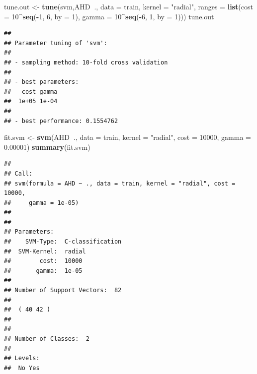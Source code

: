 \documentclass[]{article}
\newenvironment{Shaded}{\begin{snugshade}}{\end{snugshade}}
\newcommand{\DataTypeTok}[1]{\textcolor[rgb]{0.13,0.29,0.53}{#1}}
\newcommand{\DecValTok}[1]{\textcolor[rgb]{0.00,0.00,0.81}{#1}}
\newcommand{\FloatTok}[1]{\textcolor[rgb]{0.00,0.00,0.81}{#1}}
\newcommand{\KeywordTok}[1]{\textcolor[rgb]{0.13,0.29,0.53}{\textbf{#1}}}
\newcommand{\NormalTok}[1]{#1}
\newcommand{\OperatorTok}[1]{\textcolor[rgb]{0.81,0.36,0.00}{\textbf{#1}}}
\newcommand{\StringTok}[1]{\textcolor[rgb]{0.31,0.60,0.02}{#1}}
\begin{document}
\begin{Shaded}
\begin{Highlighting}[]
\NormalTok{tune.out <-}\StringTok{ }\KeywordTok{tune}\NormalTok{(svm,AHD}\OperatorTok{~}\NormalTok{., }\DataTypeTok{data =}\NormalTok{ train, }\DataTypeTok{kernel =} \StringTok{"radial"}\NormalTok{, }
                 \DataTypeTok{ranges =} \KeywordTok{list}\NormalTok{(}\DataTypeTok{cost =} \DecValTok{10}\OperatorTok{^}\KeywordTok{seq}\NormalTok{(}\OperatorTok{-}\DecValTok{1}\NormalTok{, }\DecValTok{6}\NormalTok{, }\DataTypeTok{by =} \DecValTok{1}\NormalTok{), }
                               \DataTypeTok{gamma =} \DecValTok{10}\OperatorTok{^}\KeywordTok{seq}\NormalTok{(}\OperatorTok{-}\DecValTok{6}\NormalTok{, }\DecValTok{1}\NormalTok{, }\DataTypeTok{by =} \DecValTok{1}\NormalTok{)))}
\NormalTok{tune.out}
\end{Highlighting}
\end{Shaded}

\begin{verbatim}
## 
## Parameter tuning of 'svm':
## 
## - sampling method: 10-fold cross validation 
## 
## - best parameters:
##   cost gamma
##  1e+05 1e-04
## 
## - best performance: 0.1554762
\end{verbatim}

\begin{Shaded}
\begin{Highlighting}[]
\NormalTok{fit.svm <-}\StringTok{ }\KeywordTok{svm}\NormalTok{(AHD}\OperatorTok{~}\NormalTok{., }\DataTypeTok{data =}\NormalTok{ train, }\DataTypeTok{kernel =} \StringTok{"radial"}\NormalTok{, }
               \DataTypeTok{cost =} \DecValTok{10000}\NormalTok{, }\DataTypeTok{gamma =} \FloatTok{0.00001}\NormalTok{)}
\KeywordTok{summary}\NormalTok{(fit.svm)}
\end{Highlighting}
\end{Shaded}

\begin{verbatim}
## 
## Call:
## svm(formula = AHD ~ ., data = train, kernel = "radial", cost = 10000, 
##     gamma = 1e-05)
## 
## 
## Parameters:
##    SVM-Type:  C-classification 
##  SVM-Kernel:  radial 
##        cost:  10000 
##       gamma:  1e-05 
## 
## Number of Support Vectors:  82
## 
##  ( 40 42 )
## 
## 
## Number of Classes:  2 
## 
## Levels: 
##  No Yes
\end{verbatim}

\begin{Shaded}
\end{Shaded}
\end{document}
